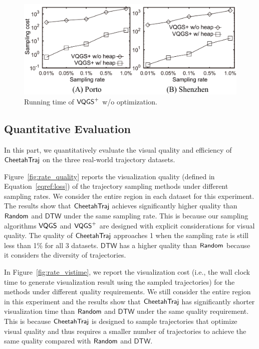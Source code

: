 \begin{figure}[!h]
	\centering
	\small
	\includegraphics[width=0.95\columnwidth]{pictures/quantitative_study/rate_cost/rate_cost_c2.pdf}  
	\trim \trim
	\caption{Running time of $\mathsf{VQGS}^+$ w/o optimization.} \label{fig:rate_algtime}
	\trim \trim
\end{figure}


\subsection{Quantitative Evaluation}\label{sec:quality}
In this part, we quantitatively evaluate the visual quality and efficiency of $\mathsf{CheetahTraj}$ on the three real-world trajectory datasets.

 Figure~\ref{fig:rate_quality} reports the visualization quality (defined in Equation~\eqref{eqref:loss}) of the trajectory sampling methods under different sampling rates.
We consider the entire region in each dataset for this experiment.
The results show that $\mathsf{CheetahTraj}$ achieves significantly higher quality than $\mathsf{Random}$ and $\mathsf{DTW}$ under the same sampling rate.
This is because our sampling algorithms $\mathsf{VQGS}$ and $\mathsf{VQGS}^+$ are designed with explicit considerations for visual quality.
The quality of $\mathsf{CheetahTraj}$ approaches 1 when the sampling rate is still less than 1\% for all 3 datasets.
$\mathsf{DTW}$ has a higher quality than $\mathsf{Random}$ because it considers the diversity of trajectories.



In Figure~\ref{fig:rate_vistime}, we report the visualization cost (i.e., the wall clock time to generate visualization result using the sampled trajectories) for the methods under different quality requirements.
We still consider the entire region in this experiment and the results show that $\mathsf{CheetahTraj}$ has significantly shorter visualization time than $\mathsf{Random}$ and $\mathsf{DTW}$ under the same quality requirement. This is because $\mathsf{CheetahTraj}$ is designed to sample trajectories that optimize visual quality and thus requires a smaller number of trajectories to achieve the same quality compared with $\mathsf{Random}$ and $\mathsf{DTW}$.     

